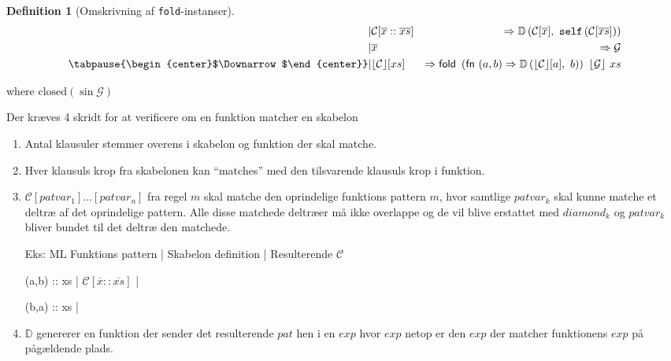 \documentclass[oneside]{memoir}
\newcommand{\floor}[1]{\ensuremath{\lfloor #1 \rfloor}}
\theoremstyle{definition}
\newtheorem{definition}{Definition}
\begin{document}
\begin{definition}[Omskrivning af \texttt{fold}-instanser] \ \\

  \begin{eqnarray*}[rqrl]
    | & \mathcal{C}[\overline{x} :: \overline{xs}] &  => \mathbb{D} \left( \mathcal{C}
      [\overline{x}],\ \mathtt{self} \left( \mathcal{C}[\overline{xs}] \right) \right) \\
    | & \overline{x} & => \mathcal{G} \\
    \tabpause{\begin{center}$\Downarrow$\end{center}}  
    | & \floor{\mathcal{C}} [xs] & => \textsf{fold } \left( \textsf{fn } (a,b) =>
      \mathbb{D}\left( \floor{\mathcal{C}}[a],\ b \right) \right) \ \floor{\mathcal{G}} \ xs
  \end{eqnarray*}
  
  where $\textrm{closed}(\sin\mathcal{G})$
  
\end{definition}



Der kræves 4 skridt for at verificere om en funktion matcher en skabelon

\begin{enumerate}
\item Antal klausuler stemmer overens i skabelon og funktion der skal matche.

\item Hver klausuls krop fra skabelonen kan ``matches'' med den tilsvarende
  klausuls krop i funktion.

\item $\mathcal{C}[patvar_1]\ldots[patvar_n]$ fra regel $m$ skal matche den
  oprindelige funktions pattern $m$, hvor samtlige $patvar_k$ skal kunne matche
  et deltræ af det oprindelige pattern. Alle disse matchede deltræer må ikke
  overlappe og de vil blive erstattet med $diamond_k$ og $patvar_k$ bliver
  bundet til det deltræ den matchede.

  Eks:
  ML Funktions pattern | Skabelon definition                         | Resulterende $\mathcal{C}$

     (a,b) :: xs       | $\mathcal{C}[\overline{x} :: \overline{xs}]$ | 

     (b,a) :: xs       | 

\item $\mathbb{D}$ genererer en funktion der sender det resulterende $pat$ hen i
  en $exp$ hvor $exp$ netop er den $exp$ der matcher funktionens $exp$ på
  pågældende plads.

\end{enumerate}
\end{document}
